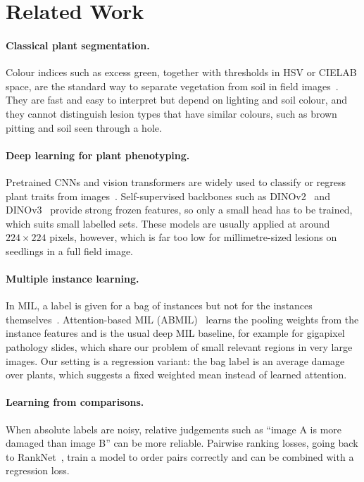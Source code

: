 \section{Related Work}
\label{sec:related}

\paragraph{Classical plant segmentation.} Colour indices such as excess green, together with
thresholds in HSV or CIELAB space, are the standard way to separate vegetation from soil in field
images~\cite{woebbecke1995color,hamuda2016survey}. They are fast and easy to interpret but depend
on lighting and soil colour, and they cannot distinguish lesion types that have similar colours,
such as brown pitting and soil seen through a hole.

\paragraph{Deep learning for plant phenotyping.} Pretrained CNNs and vision transformers are widely
used to classify or regress plant traits from images~\cite{kamilaris2018deep}. Self-supervised
backbones such as DINOv2~\cite{oquab2023dinov2} and DINOv3~\cite{dinov3} provide strong frozen
features, so only a small head has to be trained, which suits small labelled sets. These models
are usually applied at around $224\times224$ pixels, however, which is far too low for
millimetre-sized lesions on seedlings in a full field image.

\paragraph{Multiple instance learning.} In MIL, a label is given for a bag of instances but not
for the instances themselves~\cite{dietterich1997solving,carbonneau2018multiple}. Attention-based
MIL (ABMIL)~\cite{ilse2018attention} learns the pooling weights from the instance features and is
the usual deep MIL baseline, for example for gigapixel pathology slides, which share our problem of
small relevant regions in very large images. Our setting is a regression variant: the bag label is
an average damage over plants, which suggests a fixed weighted mean instead of learned attention.

\paragraph{Learning from comparisons.} When absolute labels are noisy, relative judgements such as
``image A is more damaged than image B'' can be more reliable. Pairwise ranking losses, going back
to RankNet~\cite{burges2005learning}, train a model to order pairs correctly and can be combined
with a regression loss.

